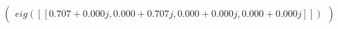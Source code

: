 \documentclass[border=1em]{standalone}
\begin{document}
$
\left(
\begin{array}{cccc}
e
i
g
(
[
[
0
.
7
0
7
+
0
.
0
0
0
j
,
 
0
.
0
0
0
+
0
.
7
0
7
j
,
 
0
.
0
0
0
+
0
.
0
0
0
j
,
 
0
.
0
0
0
+
0
.
0
0
0
j
]
]
)
\end{array}
\right)
$
\end{document}
